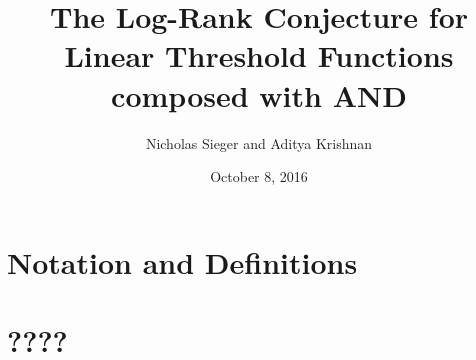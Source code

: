 \documentclass[a4paper]{article}
\title{The Log-Rank Conjecture for Linear Threshold Functions composed with AND}
\author{Nicholas Sieger and Aditya Krishnan}
\date{October 8, 2016}
\begin{document}
	\maketitle
	\section{Notation and Definitions}
	
	\section{????}
	
	
	
\end{document}
